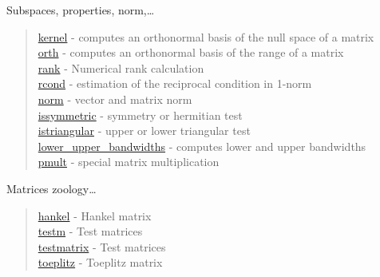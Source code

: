 Subspaces, properties, norm,\dots

\begin{quote}
\noindent
\hyperlink{kernel}{kernel} - computes an orthonormal basis of the null space of a matrix\\
\hyperlink{orth}{orth} - computes an orthonormal basis of the range of a matrix\\
\hyperlink{rank}{rank} - Numerical rank calculation \\
\hyperlink{rcond}{rcond} - estimation of the reciprocal condition in 1-norm\\
\hyperlink{norm}{norm} - vector and matrix norm\\
\hyperlink{issymmetric}{issymmetric} - symmetry or hermitian test\\
\hyperlink{istriangular}{istriangular} - upper or lower triangular test\\
\hyperlink{lower_upper_bandwidths}{lower\_upper\_bandwidths} - computes lower and upper bandwidths\\
\hyperlink{pmult}{pmult} - special matrix multiplication\\
\end{quote}

Matrices zoology\dots

\begin{quote}
\noindent
\hyperlink{hankel}{hankel} - Hankel matrix \\
\hyperlink{testm}{testm} - Test matrices  \\
\hyperlink{testmatrix}{testmatrix} - Test matrices  \\
\hyperlink{toeplitz}{toeplitz} - Toeplitz matrix \\

\end{quote}

 
 
 
 
 
 

 







 
 
 
 
 
 




